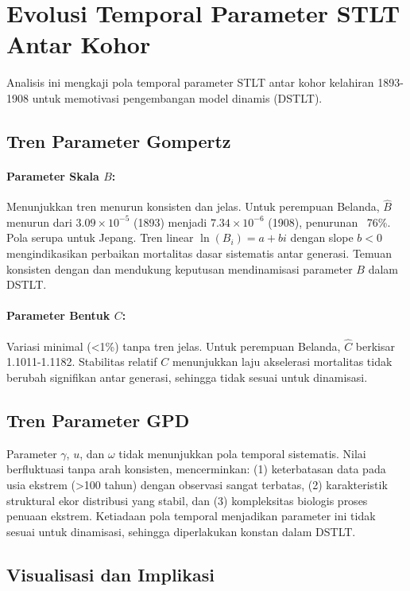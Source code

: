 \section{Evolusi Temporal Parameter STLT Antar Kohor}

Analisis ini mengkaji pola temporal parameter STLT antar kohor kelahiran 1893-1908 untuk memotivasi pengembangan model dinamis (DSTLT).

\subsection{Tren Parameter Gompertz}

\paragraph{Parameter Skala $B$:} Menunjukkan tren menurun konsisten dan jelas. Untuk perempuan Belanda, $\hat{B}$ menurun dari $3.09 \times 10^{-5}$ (1893) menjadi $7.34 \times 10^{-6}$ (1908), penurunan ~76\%. Pola serupa untuk Jepang. Tren linear $\ln(B_i) = a + bi$ dengan slope $b < 0$ mengindikasikan perbaikan mortalitas dasar sistematis antar generasi. Temuan konsisten dengan \citet{huang2020modelling} dan mendukung keputusan mendinamisasi parameter $B$ dalam DSTLT.

\paragraph{Parameter Bentuk $C$:} Variasi minimal (<1\%) tanpa tren jelas. Untuk perempuan Belanda, $\hat{C}$ berkisar 1.1011-1.1182. Stabilitas relatif $C$ menunjukkan laju akselerasi mortalitas tidak berubah signifikan antar generasi, sehingga tidak sesuai untuk dinamisasi.

\subsection{Tren Parameter GPD}

Parameter $\gamma$, $u$, dan $\omega$ tidak menunjukkan pola temporal sistematis. Nilai berfluktuasi tanpa arah konsisten, mencerminkan: (1) keterbatasan data pada usia ekstrem (>100 tahun) dengan observasi sangat terbatas, (2) karakteristik struktural ekor distribusi yang stabil, dan (3) kompleksitas biologis proses penuaan ekstrem. Ketiadaan pola temporal menjadikan parameter ini tidak sesuai untuk dinamisasi, sehingga diperlakukan konstan dalam DSTLT.

\subsection{Visualisasi dan Implikasi}

